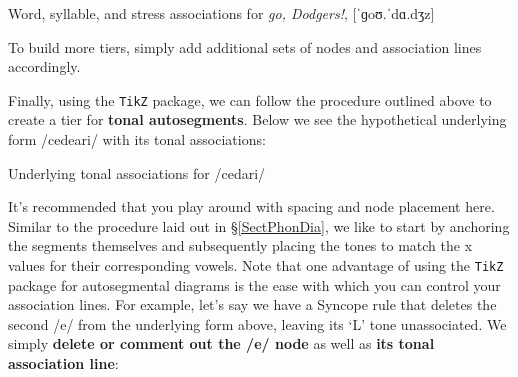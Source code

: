\documentclass{article}
\begin{document}
\ea Word, syllable, and stress associations for \textit{go, Dodgers!}, [ˈɡoʊ.ˈdɑ.dʒ\textrhookschwa z]

\z

\noindent To build more tiers, simply add additional sets of nodes and association lines accordingly.

Finally, using the \texttt{TikZ} package, we can follow the procedure outlined above to create a tier for \textbf{tonal autosegments}. Below we see the hypothetical underlying form /cedeari/ with its tonal associations:

\ea Underlying tonal associations for /cedari/

\z

\noindent It's recommended that you play around with spacing and node placement here. Similar to the procedure laid out in \S\ref{SectPhonDia}, we like to start by anchoring the segments themselves and subsequently placing the tones to match the x values for their corresponding vowels. Note that one advantage of using the \texttt{TikZ} package for autosegmental diagrams is the ease with which you can control your association lines. For example, let's say we have a Syncope rule that deletes the second /e/ from the underlying form above, leaving its `L' tone unassociated. We simply \textbf{delete or comment out the /e/ node} as well as \textbf{its tonal association line}:
\end{document}
